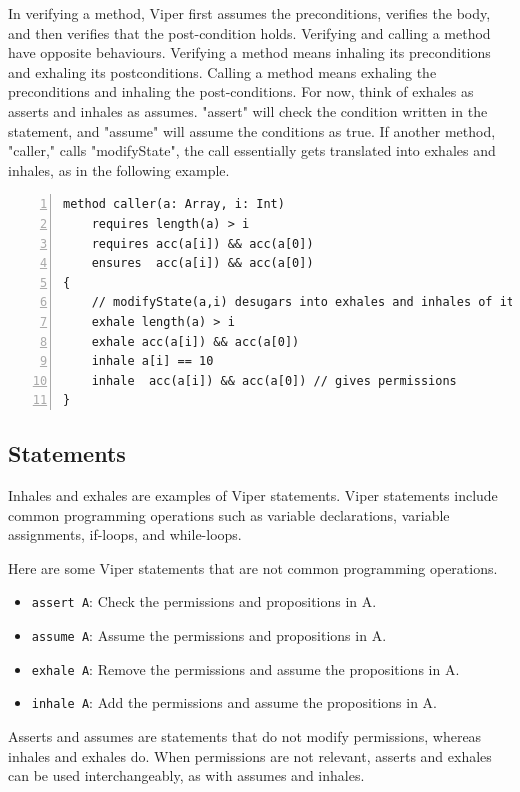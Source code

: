 \documentclass[msc,oneside]{ubcthesis}
\theoremstyle{definition}
\begin{document}
In verifying a method, Viper first assumes the preconditions, verifies the body, and then verifies that the post-condition holds. Verifying and calling a method have opposite behaviours. Verifying a method means inhaling its preconditions and exhaling its postconditions. Calling a method means exhaling the preconditions and inhaling the post-conditions. For now, think of exhales as asserts and inhales as assumes. "assert" will check the condition written in the statement, and "assume" will assume the conditions as true. If another method, "caller," calls "modifyState", the call essentially gets translated into exhales and inhales, as in the following example.
\begin{lstlisting}[language=silver,numbers=left, firstnumber=1, stepnumber=1]
method caller(a: Array, i: Int)
    requires length(a) > i
    requires acc(a[i]) && acc(a[0])
    ensures  acc(a[i]) && acc(a[0])
{
    // modifyState(a,i) desugars into exhales and inhales of its specifications.
    exhale length(a) > i
    exhale acc(a[i]) && acc(a[0])
    inhale a[i] == 10
    inhale  acc(a[i]) && acc(a[0]) // gives permissions
}
\end{lstlisting}

\subsection{Statements}
Inhales and exhales are examples of Viper statements. Viper statements include common programming operations such as variable declarations, variable assignments, if-loops, and while-loops. 

Here are some Viper statements that are not common programming operations.
\begin{itemize}
    \item \lstinline{assert A}: Check the permissions and propositions in A.
    \item \lstinline{assume A}: Assume the permissions and propositions in A.
    \item \lstinline{exhale A}: Remove the permissions and assume the propositions in A. 
    \item \lstinline{inhale A}: Add the permissions and assume the propositions in A.
\end{itemize}

Asserts and assumes are statements that do not modify permissions, whereas inhales and exhales do. When permissions are not relevant, asserts and exhales can be used interchangeably, as with assumes and inhales. 
\end{document}

